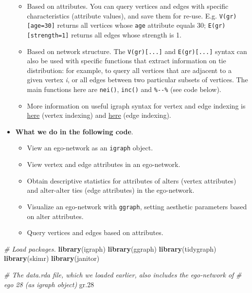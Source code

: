 \documentclass[
]{book}
\newenvironment{Shaded}{\begin{snugshade}}{\end{snugshade}}
\newcommand{\CommentTok}[1]{\textcolor[rgb]{0.56,0.35,0.01}{\textit{#1}}}
\newcommand{\FloatTok}[1]{\textcolor[rgb]{0.00,0.00,0.81}{#1}}
\newcommand{\FunctionTok}[1]{\textcolor[rgb]{0.13,0.29,0.53}{\textbf{#1}}}
\newcommand{\NormalTok}[1]{#1}
\providecommand{\tightlist}{%
  \setlength{\itemsep}{0pt}\setlength{\parskip}{0pt}}
\begin{document}
\begin{itemize}
  \begin{itemize}
  \tightlist
  \item
    Based on attributes. You can query vertices and edges with specific characteristics (attribute values), and save them for re-use. E.g. \texttt{V(gr){[}age=30{]}} returns all vertices whose \texttt{age} attribute equals 30; \texttt{E(gr){[}strength=1{]}} returns all edges whose strength is 1.
  \item
    Based on network structure. The \texttt{V(gr){[}...{]}} and \texttt{E(gr){[}...{]}} syntax can also be used with specific functions that extract information on tie distribution: for example, to query all vertices that are adjacent to a given vertex \emph{i}, or all edges between two particular subsets of vertices. The main functions here are \texttt{nei()}, \texttt{inc()} and \texttt{\%-\/-\%} (see code below).
  \item
    More information on useful igraph syntax for vertex and edge indexing is \href{http://igraph.org/r/doc/igraph-vs-indexing.html}{here} (vertex indexing) and \href{http://igraph.org/r/doc/igraph-es-indexing.html}{here} (edge indexing).
  \end{itemize}
\item
  \textbf{What we do in the following code}.

  \begin{itemize}
  \tightlist
  \item
    View an ego-network as an \texttt{igraph} object.
  \item
    View vertex and edge attributes in an ego-network.
  \item
    Obtain descriptive statistics for attributes of alters (vertex attributes) and alter-alter ties (edge attributes) in the ego-network.
  \item
    Visualize an ego-network with \texttt{ggraph}, setting aesthetic parameters based on alter attributes.
  \item
    Query vertices and edges based on attributes.
  \end{itemize}
\end{itemize}

\begin{Shaded}
\begin{Highlighting}[]
\CommentTok{\# Load packages.}
\FunctionTok{library}\NormalTok{(igraph)}
\FunctionTok{library}\NormalTok{(ggraph)}
\FunctionTok{library}\NormalTok{(tidygraph)}
\FunctionTok{library}\NormalTok{(skimr)}
\FunctionTok{library}\NormalTok{(janitor)}

\CommentTok{\# The data.rda file, which we loaded earlier, also includes the ego{-}network of }
\CommentTok{\# ego 28 (as igraph object)}
\NormalTok{gr}\FloatTok{.28}
\end{Highlighting}
\end{Shaded}
\end{document}
